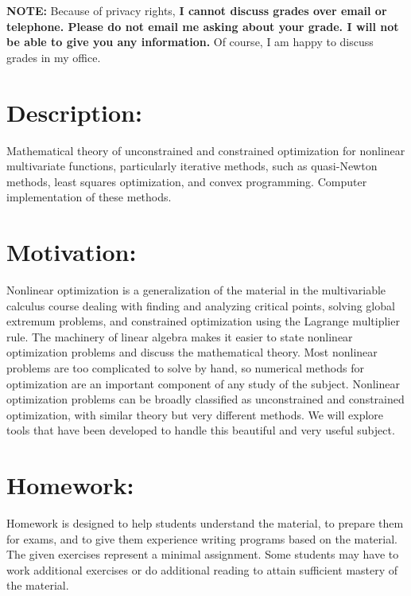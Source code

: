 \documentclass[margin]{res}
\theoremstyle{plain}
\theoremstyle{definition}
\theoremstyle{remark}
\begin{document}
\begin{resume}
\textbf{NOTE:} Because of privacy rights, \textbf{I cannot discuss grades over email or telephone. Please do not email me asking about your grade.  I will not be able to give you any information.}  Of course, I am happy to discuss grades in my office.

\section{Description:} Mathematical theory of unconstrained and constrained optimization for nonlinear multivariate functions, particularly iterative methods, such as quasi-Newton methods, least squares optimization, and convex programming.  Computer implementation of these methods.


 \section{Motivation:} Nonlinear optimization is a generalization of the material in the multivariable calculus course dealing
with finding and analyzing critical points, solving global extremum problems, and constrained
optimization using the Lagrange multiplier rule. The machinery of linear algebra makes it easier to
state nonlinear optimization problems and discuss the mathematical theory. Most nonlinear problems
are too complicated to solve by hand, so numerical methods for optimization are an important
component of any study of the subject. Nonlinear optimization problems can be broadly classified as
unconstrained and constrained optimization, with similar theory but very different methods.  We will explore tools that have been developed to handle this beautiful and very useful subject.


\section{Homework:}
Homework is designed to help students understand the material, to prepare them for exams, and to give them experience writing programs based on the material.   The given exercises represent a minimal assignment. Some students may have to work additional exercises or do additional reading to attain sufficient mastery of the material. 


\end{resume}
\end{document}
